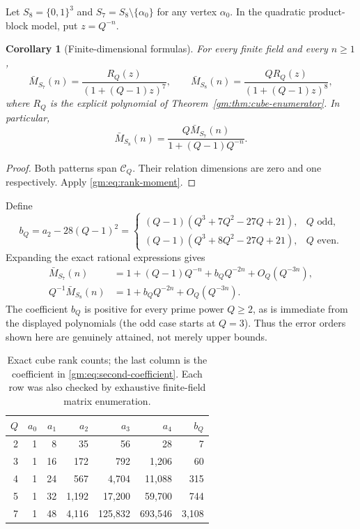 \documentclass[11pt,a4paper]{article}
\numberwithin{equation}{section}
\newtheorem{corollary}[theorem]{Corollary}
\theoremstyle{definition}
\theoremstyle{remark}
\newcommand{\1}{\mathbf 1}
\begin{document}
Let $S_8=\{0,1\}^3$ and $S_7=S_8\setminus\{\alpha_0\}$ for any vertex
$\alpha_0$. In the quadratic product-block model, put $z=Q^{-n}$.

\begin{corollary}[Finite-dimensional formulas]\label{gm:cor:exact-seven-eight}
For every finite field and every $n\geq1$,
\begin{equation}\label{gm:eq:seven-eight}
 \bar M_{S_7}(n)=\frac{R_Q(z)}{(1+(Q-1)z)^7},\qquad
 \bar M_{S_8}(n)=\frac{Q R_Q(z)}{(1+(Q-1)z)^8},
\end{equation}
where $R_Q$ is the explicit polynomial of
Theorem~\ref{gm:thm:cube-enumerator}. In particular,
\begin{equation}\label{gm:eq:seven-eight-ratio}
 \bar M_{S_8}(n)=\frac{Q\bar M_{S_7}(n)}{1+(Q-1)Q^{-n}}.
\end{equation}
\end{corollary}

\begin{proof}
Both patterns span $\mathcal C_Q$. Their relation dimensions are zero and
one respectively. Apply \eqref{gm:eq:rank-moment}.
\end{proof}

Define
\begin{equation}\label{gm:eq:second-coefficient}
 b_Q=a_2-28(Q-1)^2
 =\begin{cases}
 (Q-1)(Q^3+7Q^2-27Q+21),&Q\text{ odd},\\
 (Q-1)(Q^3+8Q^2-27Q+21),&Q\text{ even}.
 \end{cases}
\end{equation}
Expanding the exact rational expressions gives
\begin{align}
 \bar M_{S_7}(n)&=1+(Q-1)Q^{-n}+b_QQ^{-2n}+O_Q(Q^{-3n}),
                  \label{gm:eq:seven-expansion}\\
 Q^{-1}\bar M_{S_8}(n)&=1+b_QQ^{-2n}+O_Q(Q^{-3n}).
                  \label{gm:eq:eight-expansion}
\end{align}
The coefficient $b_Q$ is positive for every prime power $Q\geq2$, as is
immediate from the displayed polynomials (the odd case starts at $Q=3$).
Thus the error orders shown here are genuinely attained, not merely
upper bounds.

\begin{table}[ht]
\centering
\caption{Exact cube rank counts; the last column is the coefficient in
\eqref{gm:eq:second-coefficient}. Each row was also checked by exhaustive
finite-field matrix enumeration.}
\label{gm:tab:ranks}
\begin{tabular}{rrrrrrr}
\toprule
$Q$&$a_0$&$a_1$&$a_2$&$a_3$&$a_4$&$b_Q$\\
\midrule
2&1&8&35&56&28&7\\
3&1&16&172&792&1,206&60\\
4&1&24&567&4,704&11,088&315\\
5&1&32&1,192&17,200&59,700&744\\
7&1&48&4,116&125,832&693,546&3,108\\
\bottomrule
\end{tabular}
\end{table}
\end{document}
